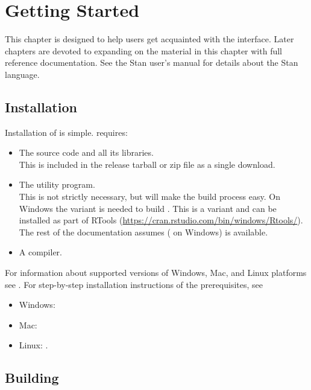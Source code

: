 \chapter{Getting Started}

\noindent
This chapter is designed to help users get acquainted with the
\CmdStan interface. Later chapters are devoted to expanding on the
material in this chapter with full reference documentation. See the
Stan user's manual for details about the Stan language.

\section{Installation}

Installation of \CmdStan is simple. \CmdStan requires:
\begin{itemize}
\item The \CmdStan source code and all its libraries. \\
  This is included in the release tarball or zip file as a single
  download.
\item The  utility program. \\
  This is not strictly necessary, but will make the build process
  easy. On Windows the  variant is needed to build
  \CmdStan. This is a  variant and can be installed as part
  of RTools (\url{https://cran.rstudio.com/bin/windows/Rtools/}). The
  rest of the documentation assumes  (
  on Windows) is available.
\item A \Cpp compiler.
\end{itemize}

\noindent For information about supported versions of Windows, Mac, and Linux
platforms see . For step-by-step installation
instructions of the prerequisites, see
\begin{itemize}
  \item Windows: 
  \item Mac: 
  \item Linux: .
\end{itemize}


\section{Building \CmdStan}

